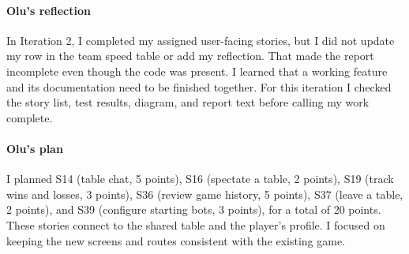 

\paragraph{Olu's reflection}
In Iteration 2, I completed my assigned user-facing stories, but I did not update my row in the team speed table or add my reflection. That made the report incomplete even though the code was present. I learned that a working feature and its documentation need to be finished together. For this iteration I checked the story list, test results, diagram, and report text before calling my work complete.

\paragraph{Olu's plan}
I planned S14 (table chat, 5 points), S16 (spectate a table, 2 points), S19 (track wins and losses, 3 points), S36 (review game history, 5 points), S37 (leave a table, 2 points), and S39 (configure starting bots, 3 points), for a total of 20 points. These stories connect to the shared table and the player's profile. I focused on keeping the new screens and routes consistent with the existing game.

